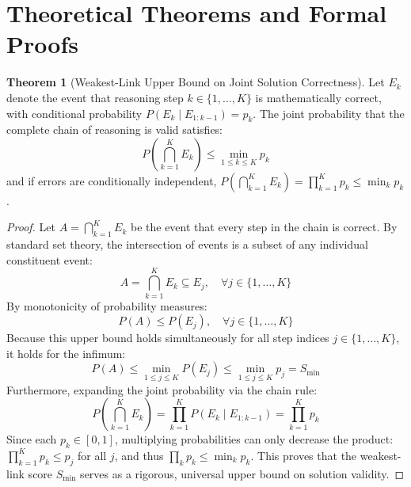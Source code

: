 \documentclass[11pt,a4paper]{article}
\theoremstyle{definition}
\newtheorem{theorem}{\textbf{Theorem}}[section]
\begin{document}
\section{Theoretical Theorems and Formal Proofs}

\begin{theorem}[Weakest-Link Upper Bound on Joint Solution Correctness]
Let $E_k$ denote the event that reasoning step $k \in \{1, \dots, K\}$ is mathematically correct, with conditional probability $P(E_k \mid E_{1:k-1}) = p_k$. The joint probability that the complete chain of reasoning is valid satisfies:
{\boldmath
\begin{equation}
P\left( \bigcap_{k=1}^K E_k \right) \le \min_{1 \le k \le K} p_k
\end{equation}
}
and if errors are conditionally independent, $P(\bigcap_{k=1}^K E_k) = \prod_{k=1}^K p_k \le \min_k p_k$.
\end{theorem}

\begin{proof}
Let $A = \bigcap_{k=1}^K E_k$ be the event that every step in the chain is correct.
By standard set theory, the intersection of events is a subset of any individual constituent event:
{\boldmath
\begin{equation}
A = \bigcap_{k=1}^K E_k \subseteq E_j, \quad \forall j \in \{1, \dots, K\}
\end{equation}
}
By monotonicity of probability measures:
{\boldmath
\begin{equation}
P(A) \le P(E_j), \quad \forall j \in \{1, \dots, K\}
\end{equation}
}
Because this upper bound holds simultaneously for all step indices $j \in \{1, \dots, K\}$, it holds for the infimum:
{\boldmath
\begin{equation}
P(A) \le \min_{1 \le j \le K} P(E_j) \le \min_{1 \le j \le K} p_j = S_{\min}
\end{equation}
}
Furthermore, expanding the joint probability via the chain rule:
{\boldmath
\begin{equation}
P\left( \bigcap_{k=1}^K E_k \right) = \prod_{k=1}^K P(E_k \mid E_{1:k-1}) = \prod_{k=1}^K p_k
\end{equation}
}
Since each $p_k \in [0, 1]$, multiplying probabilities can only decrease the product: $\prod_{k=1}^K p_k \le p_j$ for all $j$, and thus $\prod_k p_k \le \min_k p_k$.
This proves that the weakest-link score $S_{\min}$ serves as a rigorous, universal upper bound on solution validity.
\end{proof}
\end{document}
